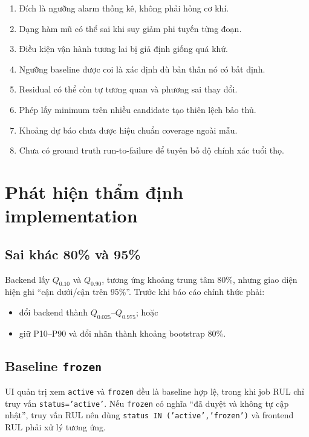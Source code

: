 \documentclass[12pt,a4paper]{article}
\newcommand{\code}[1]{\texttt{#1}}
\begin{document}
\begin{enumerate}
  \item Đích là ngưỡng alarm thống kê, không phải hỏng cơ khí.
  \item Dạng hàm mũ có thể sai khi suy giảm phi tuyến từng đoạn.
  \item Điều kiện vận hành tương lai bị giả định giống quá khứ.
  \item Ngưỡng baseline được coi là xác định dù bản thân nó có bất định.
  \item Residual có thể còn tự tương quan và phương sai thay đổi.
  \item Phép lấy minimum trên nhiều candidate tạo thiên lệch bảo thủ.
  \item Khoảng dự báo chưa được hiệu chuẩn coverage ngoài mẫu.
  \item Chưa có ground truth run-to-failure để tuyên bố độ chính xác tuổi thọ.
\end{enumerate}

\section{Phát hiện thẩm định implementation}

\subsection{Sai khác 80\% và 95\%}

Backend lấy $Q_{0.10}$ và $Q_{0.90}$, tương ứng khoảng trung tâm 80\%, nhưng giao diện hiện ghi ``cận dưới/cận trên 95\%''. Trước khi báo cáo chính thức phải:

\begin{itemize}
  \item đổi backend thành $Q_{0.025}$--$Q_{0.975}$; hoặc
  \item giữ P10--P90 và đổi nhãn thành khoảng bootstrap 80\%.
\end{itemize}

\subsection{Baseline \code{frozen}}

UI quản trị xem \code{active} và \code{frozen} đều là baseline hợp lệ, trong khi job RUL chỉ truy vấn \code{status='active'}. Nếu \code{frozen} có nghĩa ``đã duyệt và không tự cập nhật'', truy vấn RUL nên dùng \code{status IN ('active','frozen')} và frontend RUL phải xử lý tương ứng.
\end{document}
